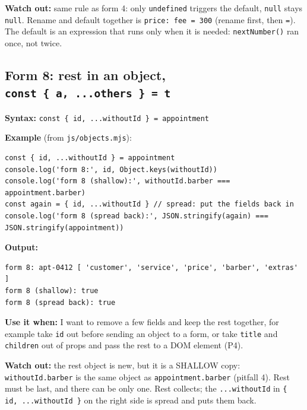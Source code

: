 \textbf{Watch out:} same rule as form 4: only \passthrough{\lstinline!undefined!} triggers the default, \passthrough{\lstinline!null!} stays \passthrough{\lstinline!null!}.
Rename and default together is \passthrough{\lstinline!price: fee = 300!} (rename first, then \passthrough{\lstinline!=!}).
The default is an expression that runs only when it is needed: \passthrough{\lstinline!nextNumber()!} ran once, not twice.

\subsection{\texorpdfstring{Form 8: rest in an object, \texttt{const\ \{\ a,\ ...others\ \}\ =\ t}}{Form 8: rest in an object, const \{ a, ...others \} = t}}\label{form-8-rest-in-an-object-const-a-...others-t}

\textbf{Syntax:} \passthrough{\lstinline!const \{ id, ...withoutId \} = appointment!}

\textbf{Example} (from \passthrough{\lstinline!js/objects.mjs!}):

\begin{lstlisting}
const { id, ...withoutId } = appointment
console.log('form 8:', id, Object.keys(withoutId))
console.log('form 8 (shallow):', withoutId.barber === appointment.barber)
const again = { id, ...withoutId } // spread: put the fields back in
console.log('form 8 (spread back):', JSON.stringify(again) === JSON.stringify(appointment))
\end{lstlisting}

\textbf{Output:}

\begin{lstlisting}
form 8: apt-0412 [ 'customer', 'service', 'price', 'barber', 'extras' ]
form 8 (shallow): true
form 8 (spread back): true
\end{lstlisting}

\textbf{Use it when:} I want to remove a few fields and keep the rest together, for example take \passthrough{\lstinline!id!} out before
sending an object to a form, or take \passthrough{\lstinline!title!} and \passthrough{\lstinline!children!} out of props and pass the rest to a DOM element (P4).

\textbf{Watch out:} the rest object is new, but it is a SHALLOW copy: \passthrough{\lstinline!withoutId.barber!} is the same object as
\passthrough{\lstinline!appointment.barber!} (pitfall 4). Rest must be last, and there can be only one.
Rest collects; the \passthrough{\lstinline!...withoutId!} in \passthrough{\lstinline!\{ id, ...withoutId \}!} on the right side is spread and puts them back.

